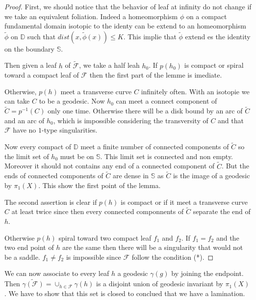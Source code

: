 \begin{proof}
First, we should notice that the behavior of leaf at infinity do not change if we take an equivalent foliation. Indeed a homeomorphism $\phi$ on a compact fundamental domain isotopic to the identy can be extend to an homeomorphism $\tilde{\phi}$ on $\mathbb{D}$ such that $dist(x,\tilde{\phi}(x)) \leq K$. This implie that $\tilde{\phi}$ extend es the identity on the boundary $\mathbb{S}$.

\smallbreak
Then given a leaf $h$ of $\mathcal{\tilde{F}}$, we take a half leah $h_0$. If $p(h_0)$ is compact or spiral toward a compact leaf of $\mathcal{F}$ then the first part of the lemme is imediate.

\smallbreak
Otherwise, $p(h)$ meet a transverse curve $C$ infinitely often. With an isotopie we can take $C$ to be a geodesic. Now $h_0$ can meet a connect component of $\tilde{C}=p^{-1}(C)$ only one time. Otherwise there will be a disk bound by an arc of $\tilde{C}$ and an arc of $h_0$, which is impossible considering the transversity of $C$ and that $\mathcal{F}$ have no $1$-type singularities.

\smallbreak
Now every compact of $\mathbb{D}$ meet a finite number of connected components of $\tilde{C}$ so the limit set of $h_0$ must be on $\mathbb{S}$. This limit set is connected and non empty. Moreover it should not contains any end of a connected component of $\tilde{C}$. But the ends of connected components of $\tilde{C}$ are dense in $\mathbb{S}$ as $\tilde{C}$ is the image of a geodesic by $\pi_1(X)$. This show the first point of the lemma.

\smallbreak
The second assertion is clear if $p(h)$ is compact or if it meet a transverse curve $C$ at least twice since then every connected componnents of $\tilde{C}$ separate the end of $h$.

\smallbreak
Otherwise $p(h)$ spiral toward two compact leaf $f_1$ and $f_2$. If $f_1=f_2$ and the two end point of $h$ are the same then there will be a singularity that would not be a saddle. $f_1 \neq f_2$ is impossible since $\mathcal{F}$ follow the condition (*).
\end{proof}

\smallbreak
We can now associate to every leaf $h$ a geodesic $\gamma(g)$ by joining the endpoint. Then $\tilde{\gamma(\mathcal{F})}= \cup_{h \in \mathcal{F}} \gamma(h)$ is a disjoint union of geodesic invariant by $\pi_1(X)$. We have to show that this set is closed to conclued that we have a lamination.

